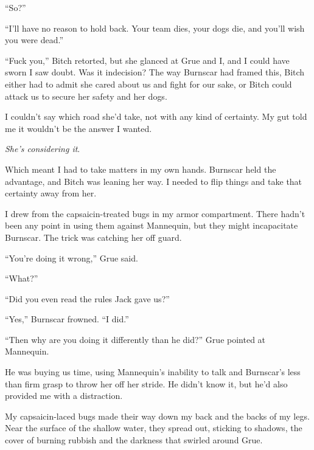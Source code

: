 ``So?''



``I'll have no reason to hold back.  Your team dies, your dogs die, and you'll wish you were dead.''



``Fuck you,'' Bitch retorted, but she glanced at Grue and I, and I could have sworn I saw doubt.  Was it indecision?  The way Burnscar had framed this, Bitch either had to admit she cared about us and fight for our sake, or Bitch could attack us to secure her safety and her dogs.



I couldn't say which road she'd take, not with any kind of certainty.  My gut told me it wouldn't be the answer I wanted.



\emph{She's considering it}.



Which meant I had to take matters in my own hands.  Burnscar held the advantage, and Bitch was leaning her way.  I needed to flip things and take that certainty away from her.



I drew from the capsaicin-treated bugs in my armor compartment.  There hadn't been any point in using them against Mannequin, but they might incapacitate Burnscar.  The trick was catching her off guard.



``You're doing it wrong,'' Grue said.



``What?''



``Did you even read the rules Jack gave us?''



``Yes,'' Burnscar frowned.  ``I did.''



``Then why are you doing it differently than he did?''  Grue pointed at Mannequin.



He was buying us time, using Mannequin's inability to talk and Burnscar's less than firm grasp to throw her off her stride.  He didn't know it, but he'd also provided me with a distraction.



My capsaicin-laced bugs made their way down my back and the backs of my legs.  Near the surface of the shallow water, they spread out, sticking to shadows, the cover of burning rubbish and the darkness that swirled around Grue.



